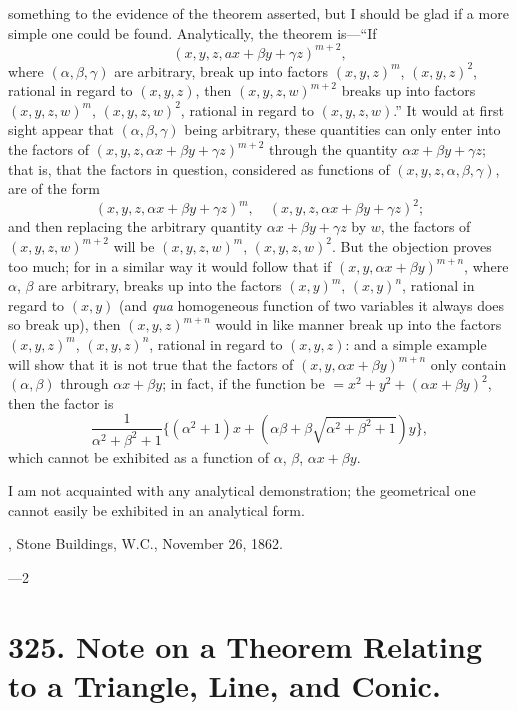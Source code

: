 \documentclass[11pt,a4paper]{article}
\theoremstyle{plain}
\begin{document}
something to the evidence of the theorem asserted, but I should be glad if a more simple one could be found. Analytically, the theorem is---``If
\[
(x, y, z, ax + \beta y + \gamma z)^{m+2},
\]
where $(\alpha, \beta, \gamma)$ are arbitrary, break up into factors $(x, y, z)^m$, $(x, y, z)^2$, rational in regard to $(x, y, z)$, then $(x, y, z, w)^{m+2}$ breaks up into factors $(x, y, z, w)^m$, $(x, y, z, w)^2$, rational in regard to $(x, y, z, w)$.'' It would at first sight appear that $(\alpha, \beta, \gamma)$ being arbitrary, these quantities can only enter into the factors of $(x, y, z, \alpha x + \beta y + \gamma z)^{m+2}$ through the quantity $\alpha x + \beta y + \gamma z$; that is, that the factors in question, considered as functions of $(x, y, z, \alpha, \beta, \gamma)$, are of the form
\[
(x, y, z, \alpha x + \beta y + \gamma z)^m, \quad (x, y, z, \alpha x + \beta y + \gamma z)^2;
\]
and then replacing the arbitrary quantity $\alpha x + \beta y + \gamma z$ by $w$, the factors of $(x, y, z, w)^{m+2}$ will be $(x, y, z, w)^m$, $(x, y, z, w)^2$. But the objection proves too much; for in a similar way it would follow that if $(x, y, \alpha x + \beta y)^{m+n}$, where $\alpha$, $\beta$ are arbitrary, breaks up into the factors $(x, y)^m$, $(x, y)^n$, rational in regard to $(x, y)$ (and \textit{qua} homogeneous function of two variables it always does so break up), then $(x, y, z)^{m+n}$ would in like manner break up into the factors $(x, y, z)^m$, $(x, y, z)^n$, rational in regard to $(x, y, z)$: and a simple example will show that it is not true that the factors of $(x, y, \alpha x + \beta y)^{m+n}$ only contain $(\alpha, \beta)$ through $\alpha x + \beta y$; in fact, if the function be $= x^2 + y^2 + (\alpha x + \beta y)^2$, then the factor is
\[
\frac{1}{\alpha^2 + \beta^2 + 1}\{(\alpha^2 + 1)x + (\alpha\beta + \beta\sqrt{\alpha^2 + \beta^2 + 1})y\},
\]
which cannot be exhibited as a function of $\alpha$, $\beta$, $\alpha x + \beta y$.

I am not acquainted with any analytical demonstration; the geometrical one cannot easily be exhibited in an analytical form.

\medskip
{}, Stone Buildings, W.C., November 26, 1862.

---2


\newpage
\section*{325. Note on a Theorem Relating to a Triangle, Line, and Conic.}
\end{document}
